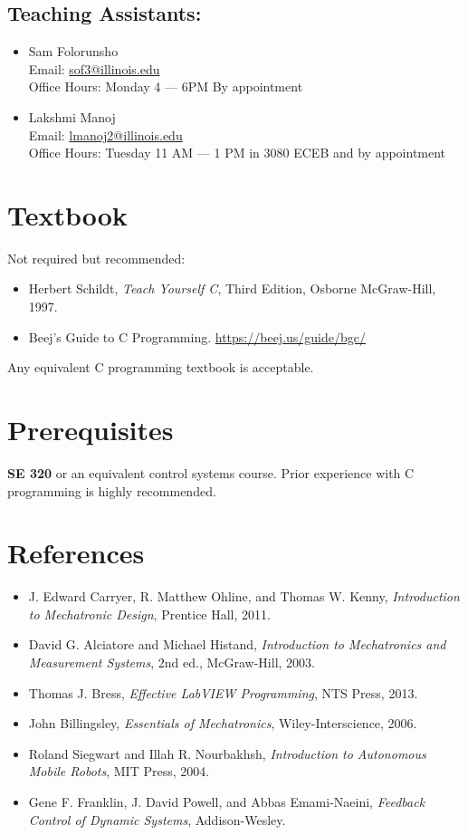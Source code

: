 \documentclass[11pt]{article}
\begin{document}
\subsection*{Teaching Assistants:}
\begin{itemize}
    \item Sam Folorunsho\\
        Email: \href{mailto:sof3@illinois.edu}{sof3@illinois.edu}\\
        Office Hours: Monday 4 --- 6PM By appointment

    \item Lakshmi Manoj\\
        Email: \href{mailto:lmanoj2@illinois.edu}{lmanoj2@illinois.edu}\\
        Office Hours: Tuesday 11 AM --- 1 PM in 3080 ECEB and by appointment
\end{itemize}
%
\section*{Textbook}

Not required but recommended:
\begin{itemize}
    \item Herbert Schildt, \textit{Teach Yourself C}, Third Edition, Osborne McGraw-Hill, 1997.
    \item Beej's Guide to C Programming. \href{https://beej.us/guide/bgc/}{https://beej.us/guide/bgc/}
\end{itemize}
Any equivalent C programming textbook is acceptable.

\section*{Prerequisites}

\textbf{SE 320} or an equivalent control systems course. Prior experience with C programming is highly recommended.

\section*{References}
%
\begin{itemize}
    \item J. Edward Carryer, R. Matthew Ohline, and Thomas W. Kenny, \textit{Introduction to Mechatronic Design}, Prentice Hall, 2011.
    \item David G. Alciatore and Michael Histand, \textit{Introduction to Mechatronics and Measurement Systems}, 2nd ed., McGraw-Hill, 2003.
    \item Thomas J. Bress, \textit{Effective LabVIEW Programming}, NTS Press, 2013.
    \item John Billingsley, \textit{Essentials of Mechatronics}, Wiley-Interscience, 2006.
    \item Roland Siegwart and Illah R. Nourbakhsh, \textit{Introduction to Autonomous Mobile Robots}, MIT Press, 2004.
    \item Gene F. Franklin, J. David Powell, and Abbas Emami-Naeini, \textit{Feedback Control of Dynamic Systems}, Addison-Wesley.
\end{itemize}
%
\end{document}

